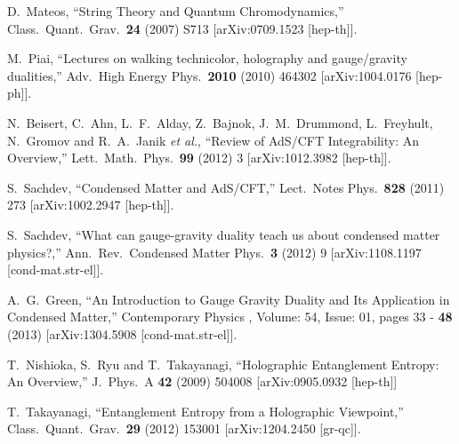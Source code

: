 \documentclass[12pt,notitlepage]{article}
\begin{document}
\begin{thebibliography}{99.}
 


  D.~Mateos,
  ``String Theory and Quantum Chromodynamics,''
  Class.\ Quant.\ Grav.\  {\bf 24} (2007) S713
  [arXiv:0709.1523 [hep-th]].

 
 
 
 
  M.~Piai,
  ``Lectures on walking technicolor, holography and gauge/gravity dualities,''
  Adv.\ High Energy Phys.\  {\bf 2010} (2010) 464302
  [arXiv:1004.0176 [hep-ph]].

 
 
  N.~Beisert, C.~Ahn, L.~F.~Alday, Z.~Bajnok, J.~M.~Drummond, L.~Freyhult, N.~Gromov and R.~A.~Janik {\it et al.},
  ``Review of AdS/CFT Integrability: An Overview,''
  Lett.\ Math.\ Phys.\  {\bf 99} (2012) 3
  [arXiv:1012.3982 [hep-th]].
 
 
 
 
  S.~Sachdev,
 ``Condensed Matter and AdS/CFT,''
  Lect.\ Notes Phys.\  {\bf 828} (2011) 273
  [arXiv:1002.2947 [hep-th]].


  S.~Sachdev,
  ``What can gauge-gravity duality teach us about condensed matter physics?,''
  Ann.\ Rev.\ Condensed Matter Phys.\  {\bf 3} (2012) 9
  [arXiv:1108.1197 [cond-mat.str-el]].
 
  A.~G.~Green,
  ``An Introduction to Gauge Gravity Duality and Its Application in Condensed Matter,''
  Contemporary Physics , Volume: 54, Issue: 01, pages 33 - {\bf 48} (2013)
  [arXiv:1304.5908 [cond-mat.str-el]].
 
 
 
  T.~Nishioka, S.~Ryu and T.~Takayanagi,
  ``Holographic Entanglement Entropy: An Overview,''
  J.\ Phys.\ A {\bf 42} (2009) 504008
  [arXiv:0905.0932 [hep-th]]
 
 
  T.~Takayanagi,
  ``Entanglement Entropy from a Holographic Viewpoint,''
  Class.\ Quant.\ Grav.\  {\bf 29} (2012) 153001
  [arXiv:1204.2450 [gr-qc]].
  

\end{thebibliography}
\end{document}
